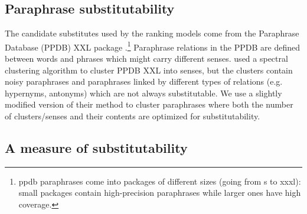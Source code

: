 \documentclass[11pt]{article}
\begin{document}
\subsection{Paraphrase substitutability}

The candidate substitutes used by the ranking models come from the Paraphrase Database (PPDB) XXL package \cite{ganitkevitch-EtAl:2013:NAACL}.\footnote{{\sc ppdb} paraphrases come into packages of different sizes (going from {\sc s} to {\sc xxxl}): small packages contain high-precision paraphrases while larger ones have high coverage.} Paraphrase relations in the PPDB are defined between words and phrases which might carry different senses.  used a spectral clustering algorithm to cluster PPDB XXL into senses, but %
the clusters contain noisy paraphrases and paraphrases linked by different types of relations (e.g. hypernyms, antonyms) which are not always substitutable. We use a slightly modified version of their method to cluster paraphrases where both the number of clusters/senses and their contents are optimized for substitutability. %



\subsection{A measure of substitutability}
\label{nmi} 
\end{document}
